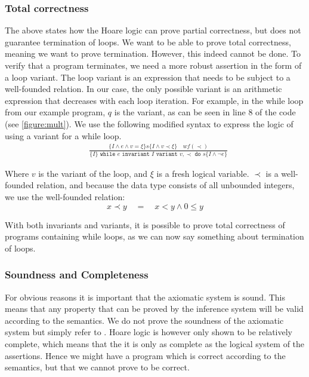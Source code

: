 \subsubsection{Total correctness}\label{sec:total-correctness}
The above states how the Hoare logic can prove partial correctness, but does not guarantee termination of loops.
We want to be able to prove total correctness, meaning we want to prove termination. However, this indeed cannot be done.
To verify that a program terminates, we need a more robust assertion in the form of a loop variant.
The loop variant is an expression that needs to be subject to a well-founded relation. In our case, the only possible variant is an arithmetic expression that decreases with each loop iteration. For example, in the while loop from our example program, $q$ is the variant, as can be seen in line 8 of the code (see \cref{figure:mult}).
We use the following modified syntax to express the logic of using a variant for a while loop.
\begin{equation}\label{eq:totalwhile}
\begin{align*}
  &\frac{
    \{I \land e \land v = \xi \} s \{I \land v \prec \xi \} \quad wf(\prec)
  }{
    \{I\} \texttt{ while } e \texttt{ invariant } I 
          \texttt{ variant } v, \prec \texttt{ do } s \{I \land \neg e\}
  }
\end{align*}
\end{equation}

Where $v$ is the variant of the loop, and $\xi$ is a fresh logical variable. $\prec$ is a well-founded relation, and because the data type consists of all unbounded integers, we use the well-founded relation\cite{wlp}:
$$x \prec y \quad = \quad x < y \land 0 \leq y $$

With both invariants and variants, it is possible to prove total correctness of programs containing while loops, as we can now say something about termination of loops.

\subsubsection{Soundness and Completeness}
For obvious reasons it is important that the axiomatic system is sound. This means that any property that can be proved by the inference system will be valid according to the semantics.
We do not prove the soundness of the axiomatic system but simply refer to \cite{nielson}.
Hoare logic is however only shown to be relatively complete\cite{}, which means that the it is only as complete as the logical system of the assertions.
Hence we might have a program which is correct according to the semantics, but that we cannot prove to be correct.
